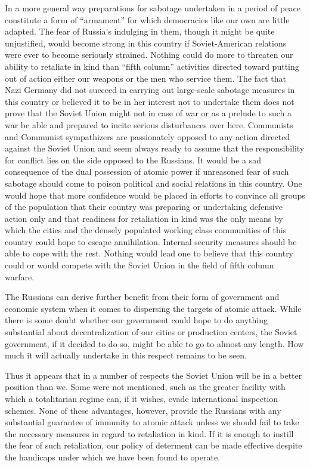 In a more general way preparations for sabotage undertaken in a period of peace constitute a form of ``armament'' for which democracies like our own are little adapted. The fear of Russia's indulging in them, though it might be quite unjustified, would become strong in this country if Soviet-American relations were ever to become seriously strained. Nothing could do more to threaten our ability to retaliate in kind than ``fifth column'' activities directed toward putting out of action either our weapons or the men who service them. The fact that Nazi Germany did not succeed in carrying out large-scale sabotage measures in this country or believed it to be in her interest not to undertake them does not prove that the Soviet Union might not in case of war or as a prelude to such a war be able and prepared to incite serious disturbances over here. Communists and Communist sympathizers are passionately opposed to any action directed against the Soviet Union and seem always ready to assume that the responsibility for conflict lies on the side opposed to the Russians. It would be a sad consequence of the dual possession of atomic power if unreasoned fear of such sabotage should come to poison political and social relations in this country. One would hope that more confidence would be placed in efforts to convince all groups of the population that their country was preparing or undertaking defensive action only and that readiness for retaliation in kind was the only means by which the cities and the densely populated working class communities of this country could hope to escape annihilation. Internal security measures should be able to cope with the rest. Nothing would lead one to believe that this country could or would compete with the Soviet Union in the field of fifth column warfare.

The Russians can derive further benefit from their form of government and economic system when it comes to dispersing the targets of atomic attack. While there is some doubt whether our government could hope to do anything substantial about decentralization of our cities or production centers, the Soviet government, if it decided to do so, might be able to go to almost any length. How much it will actually undertake in this respect remains to be seen.

Thus it appears that in a number of respects the Soviet Union will be in a better position than we. Some were not mentioned, such as the greater facility with which a totalitarian regime can, if it wishes, evade international inspection schemes. None of these advantages, however, provide the Russians with any substantial guarantee of immunity to atomic attack unless we should fail to take the necessary measures in regard to retaliation in kind. If it is enough to instill the fear of such retaliation, our policy of determent can be made effective despite the handicaps under which we have been found to operate.

